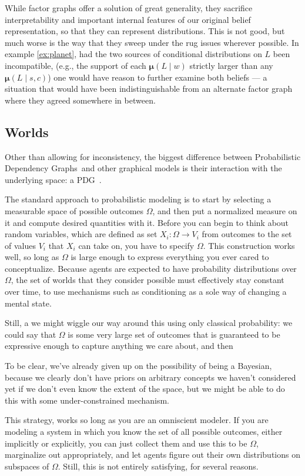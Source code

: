 \documentclass{article}
\newcommand{\modelnames}{Probabilistic Dependency Graphs}
\newcommand{\MN}{PDG}
\newcommand\bmu{\boldsymbol{\mu}}
\begin{document}
	While factor graphs offer a solution of great generality, they sacrifice interpretability and important internal features of our original belief representation, so that they can represent distributions.	
	This is not good, but much worse is the way that they sweep under the rug issues wherever possible. In example \ref{ex:planet}, had the two sources of conditional distributions on $L$ been incompatible, (e.g., the support of each $\bmu(L\mid w)$ strictly larger than any $\bmu(L\mid s,c)$) one would have reason to further examine both beliefs --- a situation that would have been indistinguishable from an alternate factor graph where they agreed somewhere in between.
	
	\subsection{Worlds}
	Other than allowing for inconsistency, the biggest difference between \modelnames\ and other graphical models is their interaction with the underlying space: a \MN\ .
	
	The standard approach to probabilistic modeling is to start by selecting a measurable space of possible outcomes $\Omega$, and then put a normalized measure on it and compute desired quantities with it. Before you can begin to think about random variables, which are defined as set $X_i : \Omega \to V_i$ from outcomes to the set of values $V_i$ that $X_i$ can take on, you have to specify $\Omega$. This construction works well, so long as $\Omega$ is large enough to express everything you ever cared to conceptualize. Because agents are expected to have probability distributions over $\Omega$, the set of worlds that they consider possible must effectively stay constant over time, to use mechanisms such as conditioning as a sole way of changing a mental state.
	
	Still, a we might wiggle our way around this using only classical probability: we could say that $\Omega$ is some very large set of outcomes that is guaranteed to be expressive enough to capture anything we care about, and then
	
	To be clear, we've already given up on the possibility of being a Bayesian, because we clearly don't have priors on arbitrary concepts we haven't considered yet if we don't even know the extent of the space, but we might be able to do this with some under-constrained mechanism.
	
	This strategy, works so long as you are an omniscient modeler. If you are modeling a system in which you know the set of all possible outcomes, either implicitly or explicitly, you can just collect them and use this to be $\Omega$, marginalize out appropriately, and let agents figure out their own distributions on subspaces of $\Omega$. Still, this is not entirely satisfying, for several reasons.
	
\end{document}
